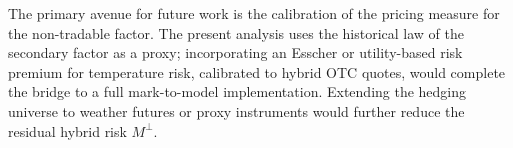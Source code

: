 \documentclass[10pt,a4paper,reqno]{amsart}
\newcommand{\1}{\mathbbm{1}}
\begin{document}
The primary avenue for future work is the calibration of the pricing measure
for the non-tradable factor.
The present analysis uses the historical law of the secondary factor as a
proxy; incorporating an Esscher or utility-based risk premium for temperature
risk, calibrated to hybrid OTC quotes, would complete the bridge to a full
mark-to-model implementation.
Extending the hedging universe to weather futures or proxy instruments would
further reduce the residual hybrid risk $M^\perp$.



\end{document}
